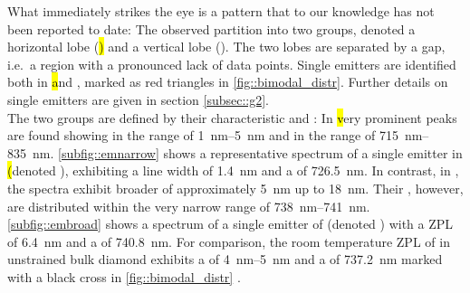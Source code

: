 	What immediately strikes the eye is a pattern that to our knowledge has not been reported to date:
	The observed \ZPLs partition into two groups, denoted a horizontal lobe (\hl) and a vertical lobe (\vl). The two lobes are separated by a gap, i.e.\ a region with a pronounced lack of data points.
	Single emitters are identified both in \hl and \vl, marked as red triangles in \autoref{fig::bimodal_distr}. Further details on single emitters are given in section \autoref{subsec::g2}.
	\\
	The two groups are defined by their characteristic \cwls and \lws:
	In \hl very prominent \ZPL peaks are found showing \lws in the range of \SIrange{1}{5}{nm} and \cwls in the range of \SIrange{715}{835}{nm}.
	\autoref{subfig::emnarrow} shows a representative spectrum of a single emitter in \hl (denoted \emnarrow), exhibiting a \ZPL line width of \SI{1.4}{nm} and a \cwl of \SI{726.5}{nm}.
	In contrast, in \vl, the spectra exhibit broader \ZPL \lws of approximately \SI{5}{nm} up to \SI{18}{nm}.
	Their \ZPL \cwls, however, are distributed within the very narrow range of \SIrange{738}{741}{nm}.
	\autoref{subfig::embroad} shows a spectrum of a single emitter of \vl (denoted \embroad) with a ZPL \lw of \SI{6.4}{nm} and a \cwl of \SI{740.8}{nm}.
	For comparison, the room temperature ZPL of \sivs in unstrained bulk diamond exhibits a \lw of \SIrange{4}{5}{nm} and a \cwl of \SI{737.2}{nm} marked with a black cross in \autoref{fig::bimodal_distr} \cite{Arend2016a,Dietrich2014}.

